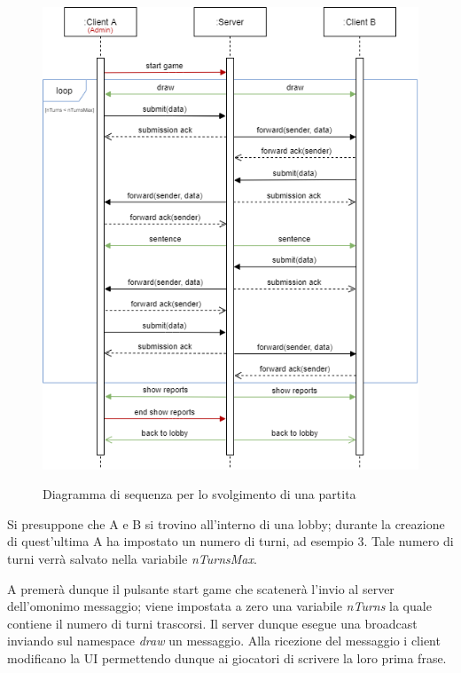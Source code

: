 \begin{figure}[H]
    \caption{Diagramma di sequenza per lo svolgimento di una partita}
    \centering
    \includegraphics[width=\linewidth]{img/uml/guessr_game_sequence.png}
    \label{fig:guessr_game_sequence}
\end{figure}

\noindent Si presuppone che A e B si trovino all'interno di una lobby; durante la creazione di quest'ultima A ha impostato un numero di turni, ad esempio 3. Tale numero di turni verrà salvato nella variabile \textit{nTurnsMax}.\newline

\noindent A premerà  dunque il pulsante start game che scatenerà l'invio al server dell'omonimo messaggio; viene impostata a zero una variabile \textit{nTurns} la quale contiene il numero di turni trascorsi.\newline
Il server dunque esegue una broadcast inviando sul namespace \textit{draw} un messaggio. Alla ricezione del messaggio i client modificano la UI permettendo dunque ai giocatori di scrivere la loro prima frase.\newline

